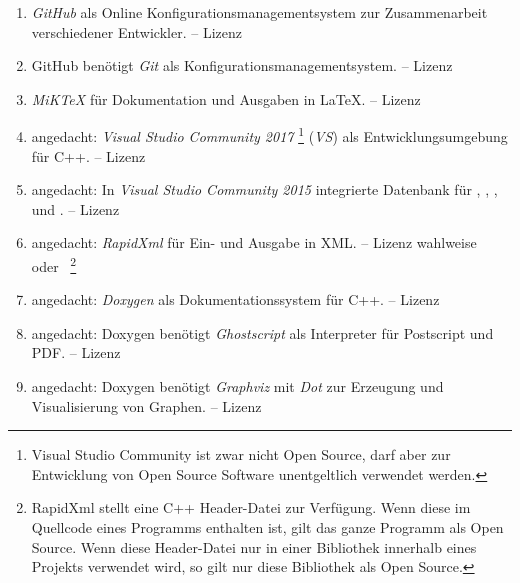 \begin{enumerate}
	\setcounter{enumi}{\value{Enumi}}%

	\item\label{Werkzeug:GitHub}\emph{GitHub}
	als Online Konfigurationsmanagementsystem
	zur Zusammenarbeit verschiedener Entwickler.
	-- Lizenz \seename~\cite{bib:GPLii}

	\item\label{Werkzeug:Git}GitHub benötigt
	\emph{Git} als Konfigurationsmanagementsystem.
	-- Lizenz \seename~\cite{bib:GPLii}

	\item\label{Werkzeug:MiKTeX}\emph{MiK\TeX}
	für Dokumentation und Ausgaben in \LaTeX.
	-- Lizenz \seename~\cite{bib:MiKTeX}

	\item\label{Werkzeug:VSC}angedacht: \emph{Visual Studio Community 2017}%
	\footnote{%
		Visual Studio Community ist zwar nicht Open Source,
		darf aber zur Entwicklung von Open Source Software
		unentgeltlich verwendet werden.%
	}
	(\emph{VS}) als Entwicklungsumgebung für C++.
	-- Lizenz \seename~\cite{bib:EULA}

	\item\label{Werkzeug:VSC DB}angedacht: In \emph{Visual Studio Community 2015}
	integrierte Datenbank für , , ,
	 und .
	-- Lizenz \seename~\cite{bib:EULA}

	\item\label{Werkzeug:RapidXml}angedacht: \emph{RapidXml}
	für Ein- und Ausgabe in XML.
	-- Lizenz \seename{} wahlweise~\cite{bib:BSLi} oder~\cite{bib:MIT}
	\footnote{%
		RapidXml stellt eine C++ Header-Datei zur Verfügung.
		Wenn diese im Quellcode eines Programms enthalten ist,
		gilt das ganze Programm als Open Source.
		Wenn diese Header-Datei nur
		in einer Bibliothek innerhalb eines Projekts verwendet wird,
		so gilt nur diese Bibliothek als Open Source.%
	}

	\item\label{Werkzeug:Doxygen}angedacht: \emph{Doxygen}
	als Dokumentationssystem für C++.
	-- Lizenz \seename~\cite{bib:GPLii}

	\item\label{Werkzeug:Ghostscript}angedacht: Doxygen benötigt \emph{Ghostscript}
	als Interpreter für Postscript und PDF.
	-- Lizenz \seename~\cite{bib:AGPL}

	\item\label{Werkzeug:Graphviz}angedacht: Doxygen
	benötigt \emph{Graphviz} mit \emph{Dot}
	zur Erzeugung und Visualisierung von Graphen.
	-- Lizenz \seename~\cite{bib:EPL}

	\setcounter{Enumi}{\value{enumi}}%
\end{enumerate}

